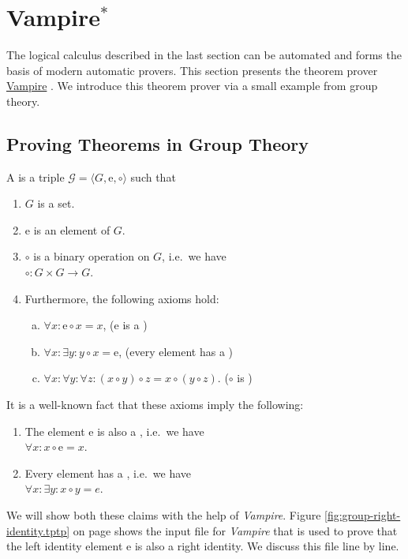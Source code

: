 \section{Vampire$^*$ }
The logical calculus described in the last section can be automated and forms the basis of modern
automatic provers.  This section presents the theorem prover \href{https://vprover.github.io}{Vampire}
\cite{kovacs:2013}.  We introduce this theorem prover via a small example from group theory.

\subsection{Proving Theorems in Group Theory}
A  is a triple $\mathcal{G} = \langle G, \mathrm{e}, \circ \rangle$
such that
\begin{enumerate}
\item $G$ is a set.
\item $\mathrm{e}$ is an element of $G$.
\item $\circ$ is a binary operation on $G$, i.e.~we have
      \\[0.2cm]
      \hspace*{1.3cm}
      $\circ: G \times G \rightarrow G$.
\item Furthermore, the following axioms hold:
      \begin{enumerate}[(a)]
      \item $\forall x: \mathrm{e} \circ x = x$, \hspace*{\fill} ($\mathrm{e}$ is a )
      \item $\forall x: \exists y: y \circ x = \mathrm{e}$, \hspace*{\fill} (every element has a ) 
      \item $\forall x: \forall y: \forall z: (x \circ y) \circ z = x \circ (y \circ z)$. \hspace*{\fill} ($\circ$ is )
      \end{enumerate}
\end{enumerate}
It is a well-known fact that these axioms imply the following:
\begin{enumerate}
\item The element $\mathrm{e}$ is also a , i.e.~we have
      \\[0.2cm]
      \hspace*{1.3cm}
      $\forall x: x \circ \mathrm{e} = x$.
\item Every element has a , i.e.~we have
      \\[0.2cm]
      \hspace*{1.3cm}
      $\forall x: \exists y: x \circ y = e$.
\end{enumerate}
We will show both these claims with the help of \textsl{Vampire}.  Figure \ref{fig:group-right-identity.tptp} on page
\pageref{fig:group-right-identity.tptp} shows the input file for \textsl{Vampire} that is used to prove that
the left identity element $\mathrm{e}$ is also a right identity.  We discuss this file line by line.

